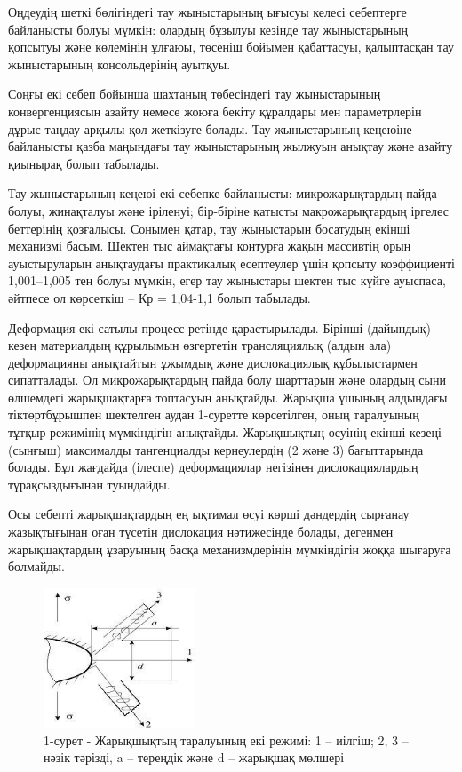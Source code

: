 \begin{multicols}{2}
Өңдеудің шеткі бөлігіндегі тау жыныстарының ығысуы келесі себептерге
байланысты болуы мүмкін: олардың бұзылуы кезінде тау жыныстарының
қопсытуы және көлемінің ұлғаюы, төсеніш бойымен қабаттасуы, қалыптасқан
тау жыныстарының консольдерінің ауытқуы.

Соңғы екі себеп бойынша шахтаның төбесіндегі тау жыныстарының
конвергенциясын азайту немесе жоюға бекіту құралдары мен параметрлерін
дұрыс таңдау арқылы қол жеткізуге болады. Тау жыныстарының кеңеюіне
байланысты қазба маңындағы тау жыныстарының жылжуын анықтау және азайту
қиынырақ болып табылады.

Тау жыныстарының кеңеюі екі себепке байланысты: микрожарықтардың пайда
болуы, жинақталуы және іріленуі; бір-біріне қатысты макрожарықтардың
іргелес беттерінің қозғалысы. Сонымен қатар, тау жыныстарын босатудың
екінші механизмі басым. Шектен тыс аймақтағы контурға жақын массивтің
орын ауыстыруларын анықтаудағы практикалық есептеулер үшін қопсыту
коэффициенті 1,001--1,005 тең болуы мүмкін, егер тау жыныстары шектен
тыс күйге ауыспаса, әйтпесе ол көрсеткіш -- Кр = 1,04-1,1 болып
табылады.

Деформация екі сатылы процесс ретінде қарастырылады. Бірінші (дайындық)
кезең материалдың құрылымын өзгертетін трансляциялық (алдын ала)
деформацияны анықтайтын ұжымдық және дислокациялық құбылыстармен
сипатталады. Ол микрожарықтардың пайда болу шарттарын және олардың сыни
өлшемдегі жарықшақтарға топтасуын анықтайды. Жарықша ұшының алдындағы
тіктөртбұрышпен шектелген аудан 1-суретте көрсетілген, оның таралуының
тұтқыр режимінің мүмкіндігін анықтайды. Жарықшықтың өсуінің екінші
кезеңі (сынғыш) максималды тангенциалды кернеулердің (2 және 3)
бағыттарында болады. Бұл жағдайда (ілеспе) деформациялар негізінен
дислокациялардың тұрақсыздығынан туындайды.

Осы себепті жарықшақтардың ең ықтимал өсуі көрші дәндердің сырғанау
жазықтығынан оған түсетін дислокация нәтижесінде болады, дегенмен
жарықшақтардың ұзаруының басқа механизмдерінің мүмкіндігін жоққа
шығаруға болмайды.
\end{multicols}

\begin{figure}[H]
	\centering
	\includegraphics[width=0.4\textwidth]{assets/1319}
	\caption*{1-сурет - Жарықшықтың таралуының екі режимі: 1 -- иілгіш; 2, 3 -- нәзік тәрізді, a -- тереңдік және d -- жарықшақ мөлшері}
\end{figure}

